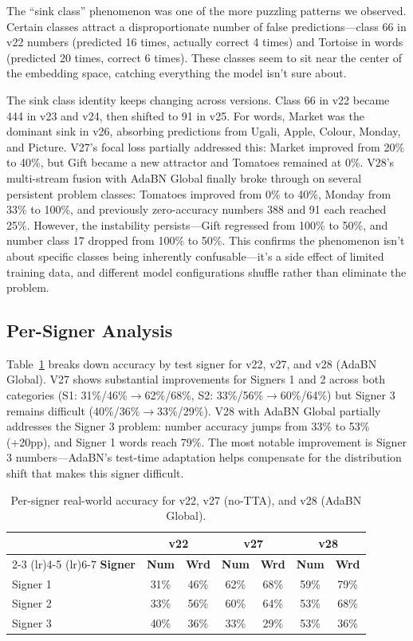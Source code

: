 \documentclass[conference]{IEEEtran}
\begin{document}
The ``sink class'' phenomenon was one of the more puzzling patterns we observed. Certain classes attract a disproportionate number of false predictions---class 66 in v22 numbers (predicted 16 times, actually correct 4 times) and Tortoise in words (predicted 20 times, correct 6 times). These classes seem to sit near the center of the embedding space, catching everything the model isn't sure about.

The sink class identity keeps changing across versions. Class 66 in v22 became 444 in v23 and v24, then shifted to 91 in v25. For words, Market was the dominant sink in v26, absorbing predictions from Ugali, Apple, Colour, Monday, and Picture. V27's focal loss partially addressed this: Market improved from 20\% to 40\%, but Gift became a new attractor and Tomatoes remained at 0\%. V28's multi-stream fusion with AdaBN Global finally broke through on several persistent problem classes: Tomatoes improved from 0\% to 40\%, Monday from 33\% to 100\%, and previously zero-accuracy numbers 388 and 91 each reached 25\%. However, the instability persists---Gift regressed from 100\% to 50\%, and number class 17 dropped from 100\% to 50\%. This confirms the phenomenon isn't about specific classes being inherently confusable---it's a side effect of limited training data, and different model configurations shuffle rather than eliminate the problem.

\subsection{Per-Signer Analysis}

Table~\ref{tab:persigner} breaks down accuracy by test signer for v22, v27, and v28 (AdaBN Global). V27 shows substantial improvements for Signers 1 and 2 across both categories (S1: 31\%/46\%$\to$62\%/68\%, S2: 33\%/56\%$\to$60\%/64\%) but Signer 3 remains difficult (40\%/36\%$\to$33\%/29\%). V28 with AdaBN Global partially addresses the Signer 3 problem: number accuracy jumps from 33\% to 53\% (+20pp), and Signer 1 words reach 79\%. The most notable improvement is Signer 3 numbers---AdaBN's test-time adaptation helps compensate for the distribution shift that makes this signer difficult.

\begin{table}[t]
\centering
\caption{Per-signer real-world accuracy for v22, v27 (no-TTA), and v28 (AdaBN Global).}
\label{tab:persigner}
\small
\begin{tabular}{@{}lcccccc@{}}
\toprule
 & \multicolumn{2}{c}{\textbf{v22}} & \multicolumn{2}{c}{\textbf{v27}} & \multicolumn{2}{c}{\textbf{v28}} \\
\cmidrule(lr){2-3} \cmidrule(lr){4-5} \cmidrule(lr){6-7}
\textbf{Signer} & \textbf{Num} & \textbf{Wrd} & \textbf{Num} & \textbf{Wrd} & \textbf{Num} & \textbf{Wrd} \\
\midrule
Signer 1 & 31\% & 46\% & 62\% & 68\% & 59\% & 79\% \\
Signer 2 & 33\% & 56\% & 60\% & 64\% & 53\% & 68\% \\
Signer 3 & 40\% & 36\% & 33\% & 29\% & 53\% & 36\% \\
\bottomrule
\end{tabular}
\end{table}
\end{document}
